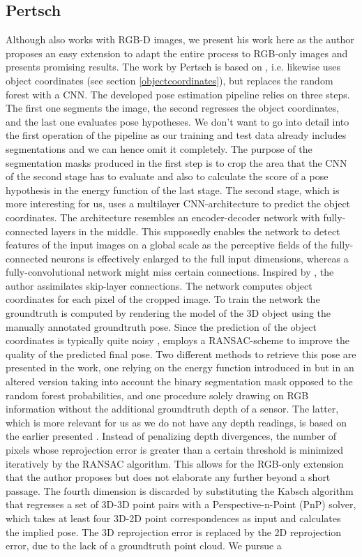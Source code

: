 \subsection{Pertsch}

Although \cite{pertsch} also works with RGB-D images, we present his work here as the author proposes an easy extension to adapt the entire process to RGB-only images and presents promising results. The work by Pertsch is based on \cite{brachmann1}, i.e. likewise uses object coordinates  (see section \ref{objectcoordinates}), but replaces the random forest with a CNN. The developed pose estimation pipeline relies on three steps. The first one segments the image, the second regresses the object coordinates, and the last one evaluates pose hypotheses. We don’t want to go into detail into the first operation of the pipeline as our training and test data already includes segmentations and we can hence omit it completely. The purpose of the segmentation masks produced in the first step is to crop the area that the CNN of the second stage has to evaluate and also to calculate the score of a pose hypothesis in the energy function of the last stage. The second stage, which is more interesting for us, uses a multilayer CNN-architecture to predict the object coordinates. The architecture resembles an encoder-decoder network with fully-connected layers in the middle. This supposedly enables the network to detect features of the input images on a global scale as the perceptive fields of the fully-connected neurons is effectively enlarged to the full input dimensions, whereas a fully-convolutional network might miss certain connections. Inspired by \cite{oronneberger}, the author assimilates skip-layer connections. The network computes object coordinates for each pixel of the cropped image. To train the network the groundtruth is computed by rendering the model of the 3D object using the manually annotated groundtruth pose. Since the prediction of the object coordinates is typically quite noisy \cite{bb8}, \cite{pertsch} employs a RANSAC-scheme to improve the quality of the predicted final pose. Two different methods to retrieve this pose are presented in the work, one relying on the energy function introduced in \cite{brachmann1} but in an altered version taking into account the binary segmentation mask opposed to the random forest probabilities, and one procedure solely drawing on RGB information without the additional groundtruth depth of a sensor. The latter, which is more relevant for us as we do not have any depth readings, is based on the earlier presented \cite{brachmann2}. Instead of penalizing depth divergences, the number of pixels whose reprojection error is greater than a certain threshold is minimized iteratively by the RANSAC algorithm. This allows for the RGB-only extension that the author proposes but does not elaborate any further beyond a short passage. The fourth dimension is discarded by substituting the Kabsch algorithm that regresses a set of 3D-3D point pairs with a Perspective-n-Point (PnP) solver, which takes at least four 3D-2D point correspondences as input and calculates the implied pose. The 3D reprojection error is replaced by the 2D reprojection error, due to the lack of a groundtruth point cloud. We pursue a 